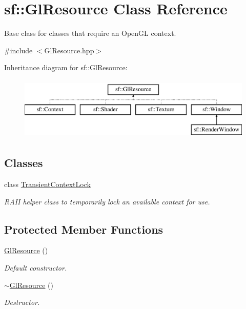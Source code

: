 \hypertarget{classsf_1_1_gl_resource}{}\section{sf\+:\+:Gl\+Resource Class Reference}
\label{classsf_1_1_gl_resource}


Base class for classes that require an Open\+GL context.  




{\ttfamily \#include $<$Gl\+Resource.\+hpp$>$}

Inheritance diagram for sf\+:\+:Gl\+Resource\+:\begin{figure}[H]
\begin{center}
\leavevmode
\includegraphics[height=3.000000cm]{classsf_1_1_gl_resource}
\end{center}
\end{figure}
\subsection*{Classes}
\begin{DoxyCompactItemize}
\item 
class \hyperlink{classsf_1_1_gl_resource_1_1_transient_context_lock}{Transient\+Context\+Lock}
\begin{DoxyCompactList}\small\item\em R\+A\+II helper class to temporarily lock an available context for use. \end{DoxyCompactList}\end{DoxyCompactItemize}
\subsection*{Protected Member Functions}
\begin{DoxyCompactItemize}
\item 
\mbox{\label{classsf_1_1_gl_resource_ad8fb7a0674f0f77e530dacc2a3b0dc6a}} 
\hyperlink{classsf_1_1_gl_resource_ad8fb7a0674f0f77e530dacc2a3b0dc6a}{Gl\+Resource} ()
\begin{DoxyCompactList}\small\item\em Default constructor. \end{DoxyCompactList}\item 
\mbox{\label{classsf_1_1_gl_resource_ab99035b67052331d1e8cf67abd93de98}} 
\hyperlink{classsf_1_1_gl_resource_ab99035b67052331d1e8cf67abd93de98}{$\sim$\+Gl\+Resource} ()
\begin{DoxyCompactList}\small\item\em Destructor. \end{DoxyCompactList}\end{DoxyCompactItemize}
